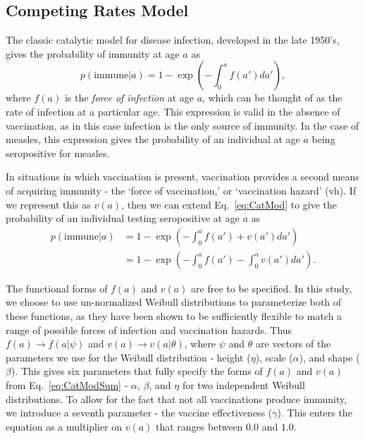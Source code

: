 \documentclass[nofootinbib,aps,pre,twocolumn,superscriptaddress,showkeys,showpacs]{revtex4-1}
\begin{document}
\subsection{Competing Rates Model \label{subsec:CompetingRates}}
The classic catalytic model for disease infection, developed in the late 1950's, gives the probability of immunity at age $a$ as
\begin{equation}
p(\mathrm{immune}|a) = 1 - \exp\left(-\int_0^a f(a') da'\right),
\label{eq:CatMod}
\end{equation}
where $f(a)$ is the \emph{force of infection} at age $a$, which can be thought of as the rate of infection at a particular age. This expression is valid in the absence of vaccination, as in this case infection is the only source of immunity. In the case of measles, this expression gives the probability of an individual at age $a$ being seropositive for measles.

In situations in which vaccination is present, vaccination provides a second means of acquiring immunity - the `force of vaccination,' or `vaccination hazard' (vh). If we represent this as $v(a)$, then we can extend Eq.~\ref{eq:CatMod} to give the probability of an individual testing seropositive at age $a$ as
\begin{align}
p(\mathrm{immune}|a)  &= 1 - \exp\left( - \int_0^a f(a') + v(a') da'\right) \nonumber \\ 
&=1 - \exp\left(-\int_0^a f(a') - \int_0^a v(a') da'\right).
\label{eq:CatModSum}
\end{align}

The functional forms of $f(a)$ and $v(a)$ are free to be specified. In this study, we choose to use un-normalized Weibull distributions to parameterize both of these functions, as they have been shown to be sufficiently flexible to match a range of possible forces of infection and vaccination hazards. Thus $f(a) \rightarrow f(a|\mathbb{\psi})$ and $v(a) \rightarrow v(a|\mathbb{\theta})$, where $\mathbb{\psi}$ and $\mathbb{\theta}$ are vectors of the parameters we use for the Weibull distribution - height ($\eta$), scale ($\alpha$), and shape ($\beta$). This gives six parameters that fully specify the forms of $f(a)$ and $v(a)$ from Eq.~\ref{eq:CatModSum} - $\alpha$, $\beta$, and $\eta$ for two independent Weibull distributions. To allow for the fact that not all vaccinations produce immunity, we introduce a seventh parameter - the vaccine effectiveness ($\gamma$). This enters the equation as a multiplier on $v(a)$ that ranges between $0.0$ and $1.0$.
\end{document}
